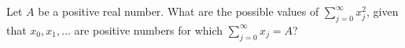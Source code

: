 Let $A$ be a positive real number.  What are the possible values of
$\sum_{j=0}^\infty x_j^2$, given that $x_0,x_1,\ldots$ are positive
numbers
for which $\sum_{j=0}^\infty x_j=A$?
